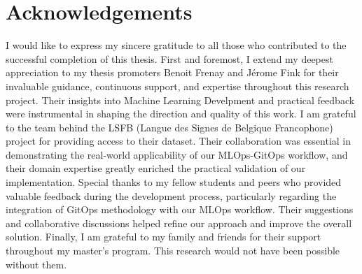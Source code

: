 \section*{Acknowledgements}
I would like to express my sincere gratitude to all those who contributed to the successful completion of this thesis.
First and foremost, I extend my deepest appreciation to my thesis promoters Benoit Frenay and Jérome Fink for their invaluable guidance, continuous support, and expertise throughout this research project.
Their insights into Machine Learning Develpment and practical feedback were instrumental in shaping the direction and quality of this work.
I am grateful to the team behind the LSFB (Langue des Signes de Belgique Francophone) project for providing access to their dataset.
Their collaboration was essential in demonstrating the real-world applicability of our MLOps-GitOps workflow, and their domain expertise greatly enriched the practical validation of our implementation.
Special thanks to my fellow students and peers who provided valuable feedback during the development process, particularly regarding the integration of GitOps methodology with our MLOps workflow.
Their suggestions and collaborative discussions helped refine our approach and improve the overall solution.
Finally, I am grateful to my family and friends for their support throughout my master's program.
This research would not have been possible without them.